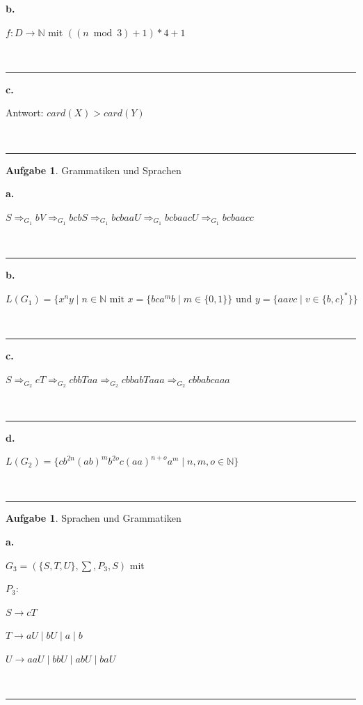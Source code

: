 \documentclass[10pt,leqno ]{article}
\theoremstyle{definition}
\newtheorem{problem}[theorem]{Aufgabe}
\newenvironment{solution}[1][L]{\begin{doublespace}\textbf{#1.}\quad }{\ \rule{0.5em}{0.5em}\end{doublespace}}
\begin{document}
\begin{solution}[b]

    \( f:D \rightarrow \mathbb{N} \) mit \( ((n \bmod 3) + 1) * 4 + 1 \)

\end{solution}

\begin{solution}[c]

    Antwort: \( card(X) > card(Y) \)
    
\end{solution}

\begin{problem}
    Grammatiken und Sprachen
\end{problem}

\begin{solution}[a]

    \(S \Rightarrow_{G_1} bV \Rightarrow_{G_1} bcbS \Rightarrow_{G_1} bcbaaU \Rightarrow_{G_1} bcbaacU \Rightarrow_{G_1} bcbaacc \)

\end{solution}

\begin{solution}[b]

    \( L(G_1) = \{ x^{n}y \mid n \in \mathbb{N} \text{ mit } x = \{bca^{m}b \mid m \in \{0,1\}\} \text{ und } y = \{aavc \mid v \in \{b,c\}^{*}\} \} \)

\end{solution}

\begin{solution}[c]

    \(S \Rightarrow_{G_2} cT \Rightarrow_{G_2} cbbTaa \Rightarrow_{G_2} cbbabTaaa \Rightarrow_{G_2} cbbabcaaa \)
    
\end{solution}

\begin{solution}[d]

    \( L(G_2) = \{ cb^{2n}(ab)^{m}b^{2o}c(aa)^{n+o}a^{m} \mid n,m,o \in \mathbb{N} \} \)


    
\end{solution}

\begin{problem}
    Sprachen und Grammatiken
\end{problem}

\begin{solution}[a]

    \( G_3 = ( \{ S,T,U \}, \sum, P_3, S ) \) mit 

    $P_3:$ 

    \( S \to cT \)

    \( T \to aU \mid bU \mid a \mid b \)

    \( U \to aaU \mid bbU \mid abU \mid baU \)

\end{solution}
\end{document}
